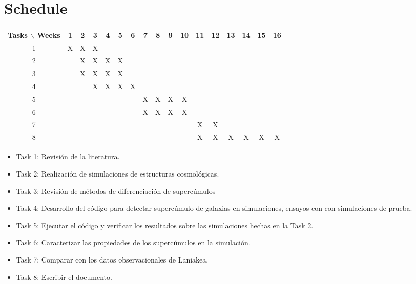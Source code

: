 \documentclass[12pt]{article}
\begin{document}
\section{Schedule}

\begin{table}[htb]
	\begin{tabular}{|c|cccccccccccccccc| }
	\hline
	Tasks $\backslash$ Weeks & 1 & 2 & 3 & 4 & 5 & 6 & 7 & 8 & 9 & 10 & 11 & 12 & 13 & 14 & 15 & 16  \\
	\hline
	1 & X & X & X &   &   &   &   &   &   &   &   &   &   &   &   &   \\
	2 &   & X & X & X & X &   &   &   &   &   &   &   &   &   &   &   \\
	3 &   & X & X & X & X &   &   &   &   &   &   &   &   &   &   &   \\
	4 &   &   & X & X & X & X &   &   &   &   &   &   &   &   &   &   \\
	5 &   &   &   &   &   &   & X & X & X & X &   &   &   &   &   &   \\
	6 &   &   &   &   &   &   & X & X & X & X &   &   &   &   &   &   \\
	7 &   &   &   &   &   &   &   &   &   &   & X & X &   &   &   &   \\
	8 &   &   &   &   &   &   &   &   &   &   & X & X & X & X & X & X \\
	\hline
	\end{tabular}
\end{table}
\vspace{1mm}

\begin{itemize}
	\item Task 1: Revisi\'{o}n de la literatura. 
	\item Task 2: Realizaci\'on de simulaciones de estructuras
          cosmol\'{o}gicas. 
	\item Task 3: Revisi\'{o}n de m\'{e}todos de
          diferenciaci\'{o}n de superc\'{u}mulos 
	\item Task 4: Desarrollo del c\'{o}digo para detectar 
          superc\'{u}mulo de galaxias en simulaciones, ensayos con 
          con simulaciones de prueba.
	\item Task 5: Ejecutar el c\'{o}digo y verificar los
          resultados sobre las simulaciones hechas en la Task 2.
	\item Task 6: Caracterizar las propiedades de los
          superc\'umulos en la simulaci\'on.
	\item Task 7: Comparar con los datos observacionales de
          Laniakea. 
	\item Task 8: Escribir el documento.
\end{itemize}
\end{document}
